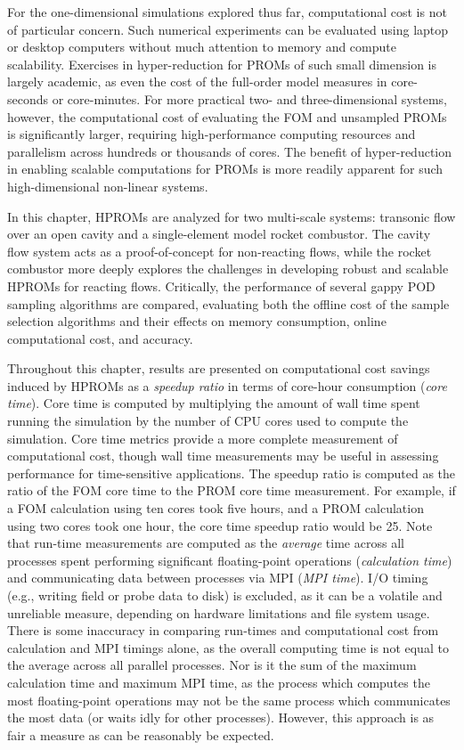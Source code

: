 For the one-dimensional simulations explored thus far, computational cost is not of particular concern. Such numerical experiments can be evaluated using laptop or desktop computers without much attention to memory and compute scalability. Exercises in hyper-reduction for PROMs of such small dimension is largely academic, as even the cost of the full-order model measures in core-seconds or core-minutes. For more practical two- and three-dimensional systems, however, the computational cost of evaluating the FOM and unsampled PROMs is significantly larger, requiring high-performance computing resources and parallelism across hundreds or thousands of cores. The benefit of hyper-reduction in enabling scalable computations for PROMs is more readily apparent for such high-dimensional non-linear systems.

In this chapter, HPROMs are analyzed for two multi-scale systems: transonic flow over an open cavity and a single-element model rocket combustor. The cavity flow system acts as a proof-of-concept for non-reacting flows, while the rocket combustor more deeply explores the challenges in developing robust and scalable HPROMs for reacting flows. Critically, the performance of several gappy POD sampling algorithms are compared, evaluating both the offline cost of the sample selection algorithms and their effects on memory consumption, online computational cost, and accuracy.

Throughout this chapter, results are presented on computational cost savings induced by HPROMs as a \textit{speedup ratio} in terms of core-hour consumption (\textit{core time}). Core time is computed by multiplying the amount of wall time spent running the simulation by the number of CPU cores used to compute the simulation. Core time metrics provide a more complete measurement of computational cost, though wall time measurements may be useful in assessing performance for time-sensitive applications. The speedup ratio is computed as the ratio of the FOM core time to the PROM core time measurement. For example, if a FOM calculation using ten cores took five hours, and a PROM calculation using two cores took one hour, the core time speedup ratio would be 25. Note that run-time measurements are computed as the \textit{average} time across all processes spent performing significant floating-point operations (\textit{calculation time}) and communicating data between processes via MPI (\textit{MPI time}). I/O timing (e.g., writing field or probe data to disk) is excluded, as it can be a volatile and unreliable measure, depending on hardware limitations and file system usage. There is some inaccuracy in comparing run-times and computational cost from calculation and MPI timings alone, as the overall computing time is not equal to the average across all parallel processes. Nor is it the sum of the maximum calculation time and maximum MPI time, as the process which computes the most floating-point operations may not be the same process which communicates the most data (or waits idly for other processes). However, this approach is as fair a measure as can be reasonably be expected.

